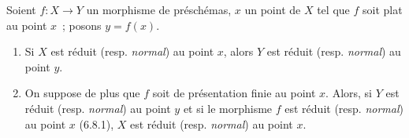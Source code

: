 \begin{proposition}[11.3.13]
\label{IV.11.3.13-fr}
Soient $f:X\to Y$ un morphisme de préschémas, $x$ un point de $X$ tel que
$f$ soit plat au point $x$~; posons $y=f(x)$.
\begin{enumerate}[label=\emph{(\roman*)}]
\item Si $X$ est réduit \textup{(resp. \emph{normal})} au point $x$, alors $Y$ est réduit
\textup{(resp. \emph{normal})} au point $y$.
\item On suppose de plus que $f$ soit de présentation finie au point $x$.
Alors, si $Y$ est réduit \textup{(resp. \emph{normal})} au point $y$ et si le morphisme $f$
est réduit \textup{(resp. \emph{normal})} au point $x$ \textup{(6.8.1)}, $X$ est réduit \textup{(resp. \emph{normal})}
au point $x$.
\end{enumerate}
\end{proposition}

